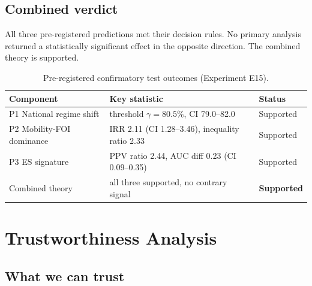 \documentclass[11pt]{article}
\begin{document}
\subsection{Combined verdict}

All three pre-registered predictions met their decision rules. No primary analysis returned a statistically significant effect in the opposite direction. The combined theory is supported.

\begin{table}[h]
\centering
\small
\begin{tabular}{lll}
\toprule
Component & Key statistic & Status \\
\midrule
P1 National regime shift & threshold $\gamma{=}80.5\%$, CI 79.0--82.0 & Supported \\
P2 Mobility-FOI dominance & IRR 2.11 (CI 1.28--3.46), inequality ratio 2.33 & Supported \\
P3 ES signature & PPV ratio 2.44, AUC diff 0.23 (CI 0.09--0.35) & Supported \\
Combined theory & all three supported, no contrary signal & \textbf{Supported} \\
\bottomrule
\end{tabular}
\caption{Pre-registered confirmatory test outcomes (Experiment E15).}
\end{table}

\section{Trustworthiness Analysis}

\subsection{What we can trust}
\end{document}
